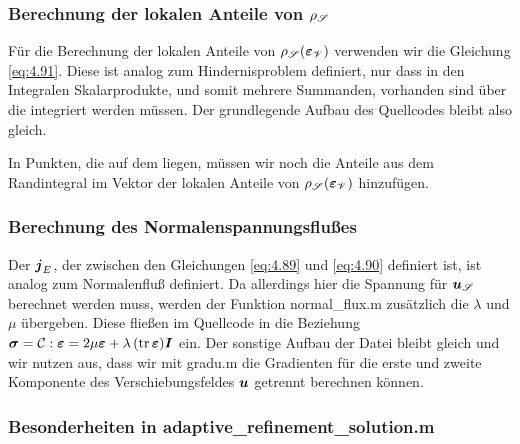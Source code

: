 \subsubsection{Berechnung der lokalen Anteile von $\rho_{\mathscr S}$}

Für die Berechnung der lokalen Anteile von $\rho_{\mathscr S}(\boldsymbol{\varepsilon}_{\mathscr V})$ verwenden wir die Gleichung \eqref{eq:4.91}. Diese ist analog zum Hindernisproblem definiert, nur dass in den Integralen Skalarprodukte, und somit mehrere Summanden, vorhanden sind über die integriert werden müssen. Der grundlegende Aufbau des Quellcodes bleibt also gleich. 

In Punkten, die auf dem  liegen, müssen wir noch die Anteile aus dem Randintegral im Vektor der lokalen Anteile von $\rho_{\mathscr S}(\boldsymbol{\varepsilon}_{\mathscr V})$ hinzufügen. 



\subsubsection{Berechnung des Normalenspannungsflußes}

Der  $\boldsymbol j_E$, der zwischen den Gleichungen \eqref{eq:4.89} und \eqref{eq:4.90} definiert ist, ist analog zum Normalenfluß definiert. Da allerdings hier die Spannung für $\boldsymbol u_{\mathscr S}$ berechnet werden muss, werden der Funktion {\ttfamily normal_flux.m} zusätzlich die  $\lambda$ und $\mu$ übergeben. Diese fließen im Quellcode in die Beziehung $\boldsymbol\sigma = \mathcal C:\boldsymbol {\varepsilon} = 2\mu \boldsymbol {\varepsilon} + \lambda \,  (\operatorname{tr} \boldsymbol {\varepsilon})  \boldsymbol I$ ein. Der sonstige Aufbau der Datei bleibt gleich und wir nutzen aus, dass wir mit {\ttfamily gradu.m} die Gradienten für die erste und zweite Komponente des Verschiebungsfeldes $\boldsymbol u$ getrennt berechnen können.



\subsubsection{Besonderheiten in {\ttfamily adaptive_refinement_solution.m}}

